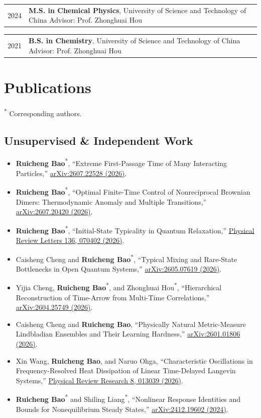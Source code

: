 \documentclass[10pt,a4paper]{article}
\makeatletter
\newcommand{\entry}[2]{%
  \begin{tabularx}{\textwidth}[t]{@{}>{\raggedright\arraybackslash}p{0.19\textwidth}>{\raggedright\arraybackslash}X@{}}
    \strut\color{muted}#1 & \strut#2
  \end{tabularx}\par
}
\newcommand{\pub}[4]{%
  \item #1, ``#2,'' \href{#4}{#3}.
}
\newcommand{\corr}[1]{#1\textsuperscript{*}}
\makeatother
\begin{document}
\entry{2024}{\textbf{M.S. in Chemical Physics}, University of Science and Technology of China\newline
Advisor: Prof. Zhonghuai Hou}

\entry{2021}{\textbf{B.S. in Chemistry}, University of Science and Technology of China\newline
Advisor: Prof. Zhonghuai Hou}

\section{Publications}

{\footnotesize\color{muted}\textsuperscript{*} Corresponding authors.}

\subsection{Unsupervised \& Independent Work}

\begin{itemize}
  \pub{\corr{\textbf{Ruicheng Bao}}}{Extreme First-Passage Time of Many Interacting Particles}{arXiv:2607.22528 (2026)}{https://arxiv.org/abs/2607.22528}
  \pub{\corr{\textbf{Ruicheng Bao}}}{Optimal Finite-Time Control of Nonreciprocal Brownian Dimers: Thermodynamic Anomaly and Multiple Transitions}{arXiv:2607.20420 (2026)}{https://arxiv.org/abs/2607.20420}
  \pub{\corr{\textbf{Ruicheng Bao}}}{Initial-State Typicality in Quantum Relaxation}{Physical Review Letters 136, 070402 (2026)}{https://doi.org/10.1103/wgr5-lb6b}
  \pub{Caisheng Cheng and \corr{\textbf{Ruicheng Bao}}}{Typical Mixing and Rare-State Bottlenecks in Open Quantum Systems}{arXiv:2605.07619 (2026)}{https://arxiv.org/abs/2605.07619}
  \pub{Yijia Cheng, \corr{\textbf{Ruicheng Bao}}, and \corr{Zhonghuai Hou}}{Hierarchical Reconstruction of Time-Arrow from Multi-Time Correlations}{arXiv:2604.25749 (2026)}{https://arxiv.org/abs/2604.25749}
  \pub{Caisheng Cheng and \textbf{Ruicheng Bao}}{Physically Natural Metric-Measure Lindbladian Ensembles and Their Learning Hardness}{arXiv:2601.01806 (2026)}{https://arxiv.org/abs/2601.01806}
  \pub{Xin Wang, \textbf{Ruicheng Bao}, and Naruo Ohga}{Characteristic Oscillations in Frequency-Resolved Heat Dissipation of Linear Time-Delayed Langevin Systems}{Physical Review Research 8, 013039 (2026)}{https://doi.org/10.1103/x2dm-9p8m}
  \pub{\corr{\textbf{Ruicheng Bao}} and \corr{Shiling Liang}}{Nonlinear Response Identities and Bounds for Nonequilibrium Steady States}{arXiv:2412.19602 (2024)}{https://arxiv.org/abs/2412.19602}
\end{itemize}
\end{document}
